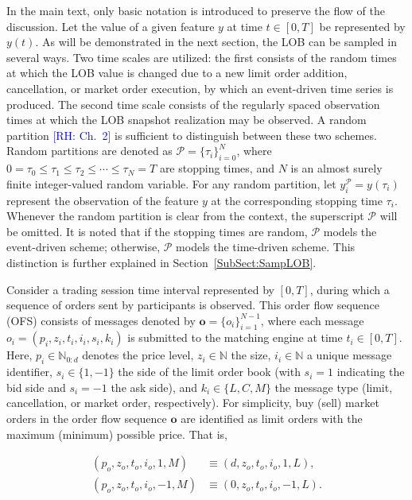 \documentclass[10pt,a4paper,oneside]{article}
\newcommand{\rh}[1]{\textcolor{blue}{\textsf{[RH: #1]}}}
\providecommand{\DIFaddtex}[1]{{\protect\color{blue} \sf #1}} %
\providecommand{\DIFdeltex}[1]{{\protect\color{red} \scriptsize #1}} %
\providecommand{\DIFaddbegin}{} %
\providecommand{\DIFaddend}{} %
\providecommand{\DIFdelbegin}{} %
\providecommand{\DIFdelend}{} %
\providecommand{\DIFadd}[1]{\texorpdfstring{\DIFaddtex{#1}}{#1}} %
\providecommand{\DIFdel}[1]{\texorpdfstring{\DIFdeltex{#1}}{}} %
\newcommand{\DIFscaledelfig}{0.5}
\newlength{\DIFdelgraphicswidth} %
\newlength{\DIFdelgraphicsheight} %
\newcommand{\DIFaddincludegraphics}[2][]{{\color{blue}\fbox{\DIFOincludegraphics[#1]{#2}}}} %
\newcommand{\DIFdelincludegraphics}[2][]{%
\sbox{\DIFdelgraphicsbox}{\DIFOincludegraphics[#1]{#2}}%
\settoboxwidth{\DIFdelgraphicswidth}{\DIFdelgraphicsbox} %
\settoboxtotalheight{\DIFdelgraphicsheight}{\DIFdelgraphicsbox} %
\scalebox{\DIFscaledelfig}{%
\parbox[b]{\DIFdelgraphicswidth}{\usebox{\DIFdelgraphicsbox}\\[-\baselineskip] \rule{\DIFdelgraphicswidth}{0em}}\llap{\resizebox{\DIFdelgraphicswidth}{\DIFdelgraphicsheight}{%
\setlength{\unitlength}{\DIFdelgraphicswidth}%
\begin{picture}(1,1)%
\thicklines\linethickness{2pt} %
{\color[rgb]{1,0,0}\put(0,0){\framebox(1,1){}}}%
{\color[rgb]{1,0,0}\put(0,0){\line( 1,1){1}}}%
{\color[rgb]{1,0,0}\put(0,1){\line(1,-1){1}}}%
\end{picture}%
}\hspace*{3pt}}} %
} %
\DeclareRobustCommand{\DIFaddbegin}{\DIFOaddbegin \let\includegraphics\DIFaddincludegraphics} %
\DeclareRobustCommand{\DIFaddend}{\DIFOaddend \let\includegraphics\DIFOincludegraphics} %
\DeclareRobustCommand{\DIFdelbegin}{\DIFOdelbegin \let\includegraphics\DIFdelincludegraphics} %
\DeclareRobustCommand{\DIFdelend}{\DIFOaddend \let\includegraphics\DIFOincludegraphics} %
\begin{document}
In the main text, only basic notation is introduced to preserve the flow of the discussion. Let the value of a given feature $y$ at time $t \in [0, T]$ be represented by $y(t)$. As will be demonstrated in the next section, the LOB can be sampled in several ways. Two time scales are utilized: the first consists of the random times at which the LOB value is changed due to a new limit order addition, cancellation, or market order execution, by which an event-driven time series is produced. The second time scale consists of the regularly spaced observation times at which the LOB snapshot realization may be observed. A random partition \DIFdelbegin \DIFdel{\citep[ch.~2]{Protter2005} \rh{Ch.~2} }\DIFdelend \DIFaddbegin \DIFadd{\citep[Ch.~2]{Protter2005} }\DIFaddend is sufficient to distinguish between these two schemes. Random partitions are denoted as \( \mathcal{P} = \{\tau_i\}_{i=0}^N \), where \( 0 = \tau_0 \leq \tau_1 \leq \tau_2 \leq \cdots \leq \tau_N = T \) are stopping times, and \( N \) is an almost surely finite integer-valued random variable. For any random partition, let $y_i^{\mathcal{P}} = y(\tau_i)$ represent the observation of the feature $y$ at the corresponding stopping time $\tau_i$. Whenever the random partition is clear from the context, the superscript $\mathcal{P}$ will be omitted. It is noted that if the stopping times are random, $\mathcal{P}$ models the event-driven scheme; otherwise, $\mathcal{P}$ models the time-driven scheme. This distinction is further explained in Section~\ref{SubSect:SampLOB}.

Consider a trading session time interval represented by $[0, T]$, during which a sequence of orders sent by participants is observed. This order flow sequence (OFS) consists of messages denoted by $\mathbf{o} = \{o_i\}_{i=1}^{N-1}$, where each message $o_i = (p_i, z_i, t_i, i_i, s_i, k_i)$ is submitted to the matching engine at time $t_i \in [0, T]$. Here, $p_i \in \mathbb{N}_{0:d}$ denotes the price level, $z_i \in \mathbb{N}$ the size, $i_i \in \mathbb{N}$ a unique message identifier, $s_i \in \{1, -1\}$ the side of the limit order book (with $s_i = 1$ indicating the bid side and $s_i = -1$ the ask side), and $k_i \in \{L, C, M\}$ the message type (limit, cancellation, or market order, respectively). For simplicity, buy (sell) market orders in the order flow sequence $\mathbf{o}$ are identified as limit orders with the maximum (minimum) possible price. That is,

\begin{align*}
    (p_o, z_o, t_o, i_o, 1,  M) & \equiv (d, z_o, t_o, i_o, 1, L),  \\
    (p_o, z_o, t_o, i_o, -1, M) & \equiv (0, z_o, t_o, i_o, -1, L).
\end{align*}
\end{document}
